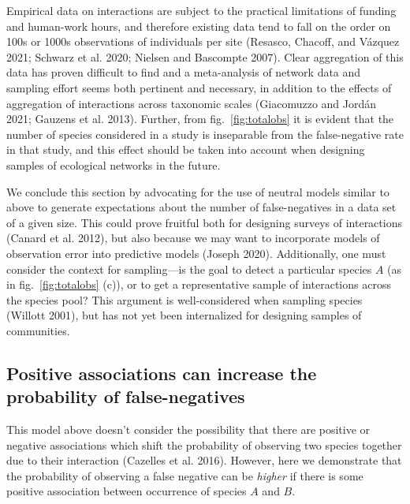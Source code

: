 \documentclass[10pt,oneside]{article}
\begin{document}
Empirical data on interactions are subject to the practical limitations
of funding and human-work hours, and therefore existing data tend to
fall on the order on 100s or 1000s observations of individuals per site
(Resasco, Chacoff, and Vázquez 2021; Schwarz et al. 2020; Nielsen and
Bascompte 2007). Clear aggregation of this data has proven difficult to
find and a meta-analysis of network data and sampling effort seems both
pertinent and necessary, in addition to the effects of aggregation of
interactions across taxonomic scales (Giacomuzzo and Jordán 2021;
Gauzens et al. 2013). Further, from fig.~\ref{fig:totalobs} it is
evident that the number of species considered in a study is inseparable
from the false-negative rate in that study, and this effect should be
taken into account when designing samples of ecological networks in the
future.

We conclude this section by advocating for the use of neutral models
similar to above to generate expectations about the number of
false-negatives in a data set of a given size. This could prove fruitful
both for designing surveys of interactions (Canard et al. 2012), but
also because we may want to incorporate models of observation error into
predictive models (Joseph 2020). Additionally, one must consider the
context for sampling---is the goal to detect a particular species \(A\)
(as in fig.~\ref{fig:totalobs} (c)), or to get a representative sample
of interactions across the species pool? This argument is
well-considered when sampling species (Willott 2001), but has not yet
been internalized for designing samples of communities.

\hypertarget{positive-associations-can-increase-the-probability-of-false-negatives}{%
\subsection{Positive associations can increase the probability of
false-negatives}\label{positive-associations-can-increase-the-probability-of-false-negatives}}

This model above doesn't consider the possibility that there are
positive or negative associations which shift the probability of
observing two species together due to their interaction (Cazelles et al.
2016). However, here we demonstrate that the probability of observing a
false negative can be \emph{higher} if there is some positive
association between occurrence of species \(A\) and \(B\).
\end{document}
